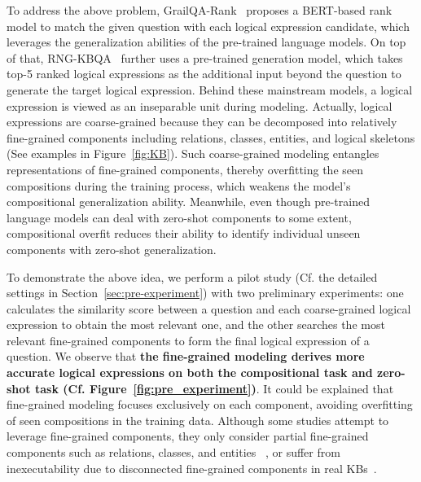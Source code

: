 To address the above problem, GrailQA-Rank~\cite{gu2021beyond} proposes a BERT-based rank model to match the given question with each logical expression candidate, which leverages the generalization abilities of the pre-trained language models. 
On top of that, RNG-KBQA~\cite{ye2022rng} further uses a pre-trained generation model, which takes top-5 ranked logical expressions as the additional input beyond the question to generate the target logical expression.  
Behind these mainstream models, a logical expression is viewed as an inseparable unit during modeling. Actually, logical expressions are coarse-grained because they can be decomposed into relatively fine-grained components including relations, classes, entities, and logical skeletons (See examples in Figure~\ref{fig:KB}). 
Such coarse-grained modeling entangles representations of fine-grained components, thereby overfitting the seen compositions during the training process, which weakens the model's compositional generalization ability. %
Meanwhile, even though pre-trained language models can deal with zero-shot components to some extent, compositional overfit reduces their ability to identify individual unseen components with zero-shot generalization. 

To demonstrate the above idea, we perform a pilot study (Cf. the detailed settings in Section~\ref{sec:pre-experiment}) with two preliminary experiments: one calculates the similarity score between a question and each coarse-grained logical expression to obtain the most relevant one, and the other searches the most relevant fine-grained components to form the final logical expression of a question. We observe that \textbf{the fine-grained modeling derives more accurate logical expressions on both the compositional task and zero-shot task (Cf. Figure~\ref{fig:pre_experiment})}. It could be explained that fine-grained modeling focuses exclusively on each component, avoiding overfitting of seen compositions in the training data. 
Although some studies attempt to leverage fine-grained components, they only consider partial fine-grained components such as relations, classes, and entities ~\cite{chen-etal-2021-retrack}, or suffer from inexecutability due to disconnected fine-grained components in real KBs~\cite{shu2022tiara}.

